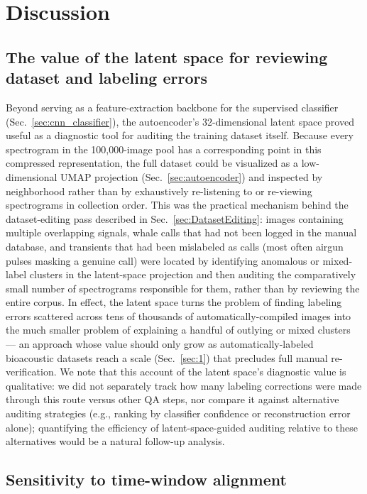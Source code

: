 \documentclass[preprint,NumberedRefs]{JASAnew}
\begin{document}
\section{Discussion}

\subsection{The value of the latent space for reviewing dataset and labeling errors}

Beyond serving as a feature-extraction backbone for the supervised classifier
(Sec.~\ref{sec:cnn_classifier}), the autoencoder's 32-dimensional latent space
proved useful as a diagnostic tool for auditing the training dataset itself.
Because every spectrogram in the 100,000-image pool has a corresponding point
in this compressed representation, the full dataset could be visualized as a
low-dimensional UMAP projection (Sec.~\ref{sec:autoencoder}) and inspected by
neighborhood rather than by exhaustively re-listening to or re-viewing
spectrograms in collection order. This was the practical mechanism behind the
dataset-editing pass described in Sec.~\ref{sec:DatasetEditing}: images
containing multiple overlapping signals, whale calls that had not been logged
in the manual database, and transients that had been mislabeled as calls
(most often airgun pulses masking a genuine call) were located by identifying
anomalous or mixed-label clusters in the latent-space projection and then
auditing the comparatively small number of spectrograms responsible for them,
rather than by reviewing the entire corpus. In effect, the latent space turns
the problem of finding labeling errors scattered across tens of thousands of
automatically-compiled images into the much smaller problem of explaining a
handful of outlying or mixed clusters — an approach whose value should only
grow as automatically-labeled bioacoustic datasets reach a scale (Sec.~\ref{sec:1})
that precludes full manual re-verification. We note that this account of the
latent space's diagnostic value is qualitative: we did not separately track
how many labeling corrections were made through this route versus other QA
steps, nor compare it against alternative auditing strategies (e.g., ranking
by classifier confidence or reconstruction error alone); quantifying the
efficiency of latent-space-guided auditing relative to these alternatives
would be a natural follow-up analysis.

\subsection{Sensitivity to time-window alignment}
\end{document}
